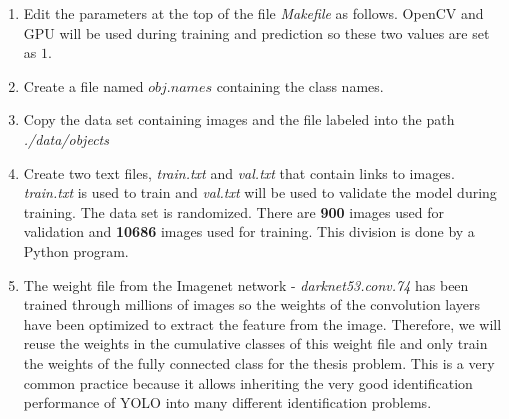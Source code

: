 \documentclass[conference]{IEEEtran}
\begin{document}
\begin{enumerate}
	\item Edit the parameters at the top of the file \emph{Makefile} as follows. OpenCV and GPU will be used during training and prediction so these two values are set as $ 1 $.

\noindent{}

	\item Create a file named $ obj.names $ containing the class names.

\noindent{}

	\item Copy the data set containing images and the file labeled into the path \emph{./data/objects}

	\item Create two text files, \emph{train.txt} and \emph{val.txt} that contain links to images. \emph{train.txt} is used to train and \emph{val.txt} will be used to validate the model during training. The data set is randomized. There are \textbf{900} images used for validation and \textbf{10686} images used for training. This division is done by a Python program.

	\item The weight file from the Imagenet network - \emph{darknet53.conv.74} has been trained through millions of images so the weights of the convolution layers have been optimized to extract the feature from the image. Therefore, we will reuse the weights in the cumulative classes of this weight file and only train the weights of the fully connected class for the thesis problem. This is a very common practice because it allows inheriting the very good identification performance of YOLO into many different identification problems.
	

\end{enumerate}
\end{document}
